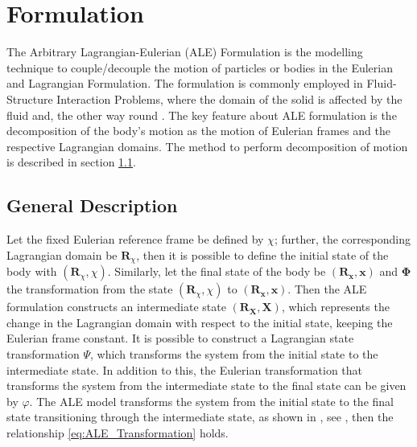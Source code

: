 \chapter{Formulation}
The Arbitrary Lagrangian-Eulerian (ALE) Formulation is the modelling technique to couple/decouple the motion of particles or bodies in the Eulerian and Lagrangian Formulation. The formulation is commonly employed in Fluid-Structure Interaction Problems, where the domain of the solid is affected by the fluid and, the other way round \cite{ait2002}.
The key feature about ALE formulation is the decomposition of the body's motion as the motion of Eulerian frames and the respective Lagrangian domains. The method to perform decomposition of motion is described in section \ref{ALE_Description}.
\section{General Description}
\label{ALE_Description}
Let the fixed Eulerian reference frame be defined by $\chi$; further, the corresponding Lagrangian domain be $\mathbf{R}_{\chi}$, then it is possible to define the initial state of the body with $(\mathbf{R}_{\chi}, \chi)$. Similarly, let the final state of the body be $(\mathbf{R}_{\mathbf{x}}, \mathbf{x})$ and $\boldsymbol{\Phi}$ the transformation from the state $(\mathbf{R}_{\chi}, \chi)$ to $(\mathbf{R}_{\mathbf{x}}, \mathbf{x})$. Then the ALE formulation constructs an intermediate state $(\mathbf{R}_{\mathbf{X}}, \mathbf{X})$, which represents the change in the Lagrangian domain with respect to the initial state, keeping the Eulerian frame constant. It is possible to construct a Lagrangian state transformation $\Psi$, which transforms the system from the initial state to the intermediate state. In addition to this, the Eulerian transformation that transforms the system from the intermediate state to the final state can be given by $\varphi$. The ALE model transforms the system from the initial state to the final state transitioning through the intermediate state, as shown in , see \cite{donea2017}, then the relationship \eqref{eq:ALE_Transformation} holds.

